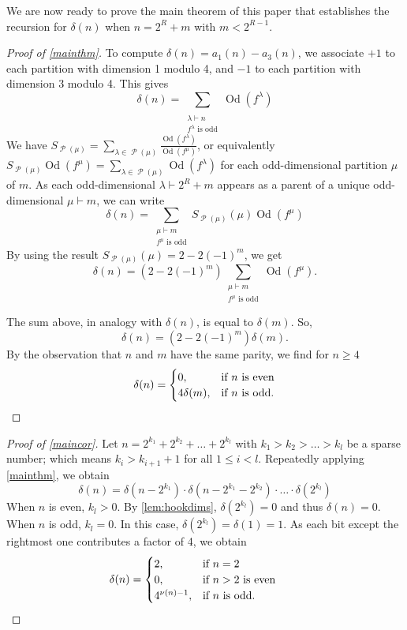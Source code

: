 \documentclass[12pt]{amsart}
\theoremstyle{definition}
\numberwithin{equation}{section}
\newcommand{\la}{\lambda}
\DeclareMathOperator{\p}{\mathcal{P}}
\DeclareMathOperator{\Od}{Od}
\begin{document}
We are now ready to prove the main theorem of this paper that establishes the recursion for $\delta(n)$ when $n = 2^{R}+m$ with $m < 2^{R-1}$.
\begin{proof}[Proof of \cref{mainthm}]
To compute $\delta(n) = a_1(n) - a_3(n)$, we associate $+1$ to each partition with dimension 1 modulo 4, and $-1$ to each partition with dimension 3 modulo 4. This gives
\[
\delta(n) = \sum\limits_{\substack{\\\lambda\vdash n\\f^\lambda \text{ is odd}}} \Od(f^\lambda)
\]
We have $S_{\p(\mu)} = \sum_{\la\in \p(\mu)} \frac{\Od(f^\la)}{\Od(f^\mu)}$, or equivalently $S_{\p(\mu)} \Od(f^\mu) = \sum_{\la\in \p(\mu)} \Od(f^\la)$ for each odd-dimensional partition $\mu$ of $m$. As each odd-dimensional $\la\vdash 2^R + m$ appears as a parent of a unique odd-dimensional $\mu\vdash m$, we can write
\[
\delta(n) = \sum\limits_{\substack{\mu\vdash m\\f^\mu \text{ is odd}}} S_{\p(\mu)}({\mu})\Od(f^{\mu})
\]
By using the result $S_{\p(\mu)}(\mu) = 2 - 2(-1)^m$, we get 
\[
\delta(n) = (2 - 2(-1)^m) \sum\limits_{\substack{\mu\vdash m\\f^\mu \text{ is odd}}} \Od(f^{\mu}).
\]

The sum above, in analogy with $\delta(n)$, is equal to $\delta(m)$. So,
\[
\delta(n) = (2-2(-1)^m )\delta(m).
\]
By the observation that $n$ and $m$ have the same parity, we find for $n \geq 4$
\[
\delta(n) = \begin{cases}
0, & \text{if }n \text{ is even}\\
4 \delta(m), &\text{if } n \text{ is odd}. \qedhere
\end{cases}
\]
\end{proof}
\begin{proof}[Proof of \cref{maincor}]
Let $n = 2^{k_1} + 2^{k_2} + \ldots + 2^{k_l}$ with $k_1 > k_2 > \ldots > k_l$ be a sparse number; which means $k_i > k_{i+1} + 1$ for all $1\leq i < l$.
Repeatedly applying \cref{mainthm}, we obtain 
\[
\delta(n) = \delta(n-2^{k_1})\cdot \delta(n-2^{k_1}- 2^{k_2}) \cdot \ldots \cdot \delta(2^{k_l})
\]
When $n$ is even, $k_l >0$. By \cref{lem:hookdims}, $\delta(2^{k_l}) =0$ and thus $\delta(n) = 0$. When $n$ is odd, $k_l = 0$. In this case, $\delta(2^{k_l}) = \delta(1) = 1$. As each bit except the rightmost one contributes a factor of 4, we obtain
\[
\delta(n) = \begin{cases}
2\text{,} & \text{if }n = 2\\
0, &\text{if } n > 2 \text{ is even}\\
4^{\nu(n) - 1}, & \text{if } n\text{ is odd}.\qquad\qquad\qedhere
\end{cases}
\]
\end{proof} 
\end{document}
